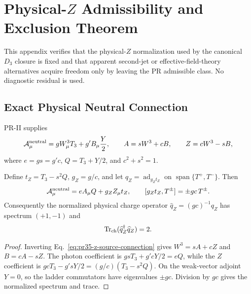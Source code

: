 \section{Physical-\texorpdfstring{$Z$}{Z} Admissibility and Exclusion Theorem}
\thispagestyle{plain}
\renewcommand{\headrulewidth}{0pt} %
\label{app:physical-z-hessian-obstruction}

This appendix verifies that the physical-$Z$ normalization used by the
canonical $D_3$ closure is fixed and that apparent second-jet or
effective-field-theory alternatives acquire freedom only by leaving the PR
admissible class.  No diagnostic residual is used.

\subsection{Exact Physical Neutral Connection}

PR-II supplies
\begin{equation}
 \mathcal A_\mu^{\rm neutral}
 =gW_\mu^3T_3+g'B_\mu\frac{Y}{2},
 \qquad A=sW^3+cB,\qquad Z=cW^3-sB,
 \label{eq:pr35-z-source-connection}
\end{equation}
where $e=gs=g'c$, $Q=T_3+Y/2$, and $c^2+s^2=1$.

\begin{proposition}
\label{prop:pr35-physical-z-generator}
Define $t_Z=T_3-s^2Q$, $g_Z=g/c$, and let
$q_Z=\operatorname{ad}_{g_Zt_Z}$ on
$\operatorname{span}\{T^+,T^-\}$.  Then
\begin{equation}
 \mathcal A_\mu^{\rm neutral}=eA_\mu Q+g_ZZ_\mu t_Z,
 \qquad [g_Zt_Z,T^\pm]=\pm gc\,T^\pm.
\end{equation}
Consequently the normalized physical charge operator
$\widehat q_Z=(gc)^{-1}q_Z$ has spectrum $(+1,-1)$ and
\begin{equation}
 \operatorname{Tr}_{\rm ch}
 (\widehat q_Z^\dagger\widehat q_Z)=2.
 \label{eq:pr35-z-physical-vector-trace}
\end{equation}
\end{proposition}

\begin{proof}
Inverting Eq.~\eqref{eq:pr35-z-source-connection} gives
$W^3=sA+cZ$ and $B=cA-sZ$.  The photon coefficient is
$gsT_3+g'cY/2=eQ$, while the $Z$ coefficient is
$gcT_3-g'sY/2=(g/c)(T_3-s^2Q)$.  On the weak-vector adjoint $Y=0$, so the
ladder commutators have eigenvalues $\pm gc$.  Division by $gc$ gives the
normalized spectrum and trace.
\end{proof}

